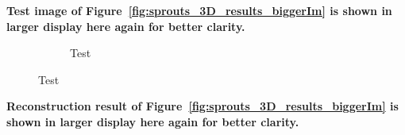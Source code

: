 \documentclass{article}
\begin{document}
\newpage
\textbf{Test image of Figure~\ref{fig:sprouts_3D_results_biggerIm}  is shown in larger display here  again for better clarity.}\\
\begin{figure}[!h]
    \begin{subfigure}[b]{\linewidth}
\captionsetup{labelformat=empty}
        \caption{\large{Test}}
     \end{subfigure}
\end{figure}
\newpage
\textbf{Reconstruction result of Figure~\ref{fig:sprouts_3D_results_biggerIm}  is shown in larger display here  again for better clarity.}\\
\end{document}
